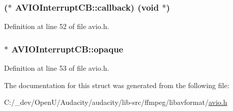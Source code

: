 \subsubsection[{\texorpdfstring{callback}{callback}}]{($\ast$ A\+V\+I\+O\+Interrupt\+C\+B\+::callback) ({\bf void} $\ast$)}\hypertarget{struct_a_v_i_o_interrupt_c_b_ac5de25559a8b29f3e55a3e956115e54a}{}\label{struct_a_v_i_o_interrupt_c_b_ac5de25559a8b29f3e55a3e956115e54a}


Definition at line 52 of file avio.\+h.

\subsubsection[{\texorpdfstring{opaque}{opaque}}]{$\ast$ A\+V\+I\+O\+Interrupt\+C\+B\+::opaque}\hypertarget{struct_a_v_i_o_interrupt_c_b_a873ae56fef71d27dca1088dfd55c2197}{}\label{struct_a_v_i_o_interrupt_c_b_a873ae56fef71d27dca1088dfd55c2197}


Definition at line 53 of file avio.\+h.



The documentation for this struct was generated from the following file\+:\begin{DoxyCompactItemize}
\item 
C\+:/\+\_\+dev/\+Open\+U/\+Audacity/audacity/lib-\/src/ffmpeg/libavformat/\hyperlink{avio_8h}{avio.\+h}\end{DoxyCompactItemize}
